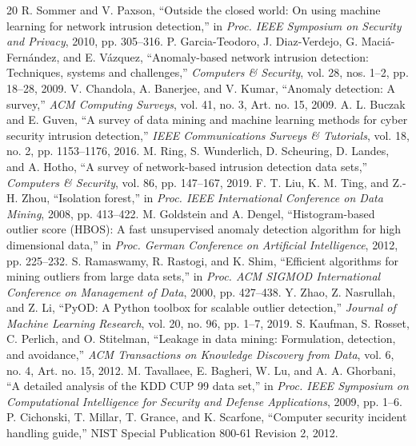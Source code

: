\documentclass[conference]{IEEEtran}
\begin{document}
\begin{thebibliography}{20}
R. Sommer and V. Paxson, ``Outside the closed world: On using machine learning for network intrusion detection,'' in \emph{Proc. IEEE Symposium on Security and Privacy}, 2010, pp. 305--316.
P. Garcia-Teodoro, J. Diaz-Verdejo, G. Maci\'{a}-Fern\'{a}ndez, and E. V\'{a}zquez, ``Anomaly-based network intrusion detection: Techniques, systems and challenges,'' \emph{Computers \& Security}, vol. 28, nos. 1--2, pp. 18--28, 2009.
V. Chandola, A. Banerjee, and V. Kumar, ``Anomaly detection: A survey,'' \emph{ACM Computing Surveys}, vol. 41, no. 3, Art. no. 15, 2009.
A. L. Buczak and E. Guven, ``A survey of data mining and machine learning methods for cyber security intrusion detection,'' \emph{IEEE Communications Surveys \& Tutorials}, vol. 18, no. 2, pp. 1153--1176, 2016.
M. Ring, S. Wunderlich, D. Scheuring, D. Landes, and A. Hotho, ``A survey of network-based intrusion detection data sets,'' \emph{Computers \& Security}, vol. 86, pp. 147--167, 2019.
F. T. Liu, K. M. Ting, and Z.-H. Zhou, ``Isolation forest,'' in \emph{Proc. IEEE International Conference on Data Mining}, 2008, pp. 413--422.
M. Goldstein and A. Dengel, ``Histogram-based outlier score (HBOS): A fast unsupervised anomaly detection algorithm for high dimensional data,'' in \emph{Proc. German Conference on Artificial Intelligence}, 2012, pp. 225--232.
S. Ramaswamy, R. Rastogi, and K. Shim, ``Efficient algorithms for mining outliers from large data sets,'' in \emph{Proc. ACM SIGMOD International Conference on Management of Data}, 2000, pp. 427--438.
Y. Zhao, Z. Nasrullah, and Z. Li, ``PyOD: A Python toolbox for scalable outlier detection,'' \emph{Journal of Machine Learning Research}, vol. 20, no. 96, pp. 1--7, 2019.
S. Kaufman, S. Rosset, C. Perlich, and O. Stitelman, ``Leakage in data mining: Formulation, detection, and avoidance,'' \emph{ACM Transactions on Knowledge Discovery from Data}, vol. 6, no. 4, Art. no. 15, 2012.
M. Tavallaee, E. Bagheri, W. Lu, and A. A. Ghorbani, ``A detailed analysis of the KDD CUP 99 data set,'' in \emph{Proc. IEEE Symposium on Computational Intelligence for Security and Defense Applications}, 2009, pp. 1--6.
P. Cichonski, T. Millar, T. Grance, and K. Scarfone, ``Computer security incident handling guide,'' NIST Special Publication 800-61 Revision 2, 2012.

\end{thebibliography}
\end{document}
